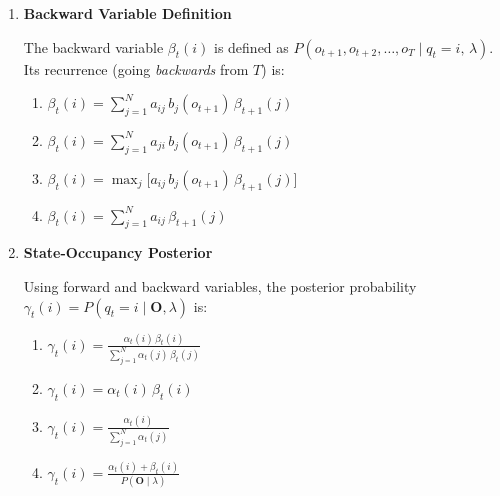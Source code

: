 \documentclass[12pt]{article}
\begin{document}
\begin{enumerate}[label=\textbf{Q\arabic*.}, leftmargin=*, itemsep=2em]
Given the forward variables $\{\alpha_t(i)\}$, the total likelihood
$P(\mathbf{O}\mid\lambda)$ is computed as:

\begin{enumerate}[label=\Alph*.]
    \item $\displaystyle P(\mathbf{O}\mid\lambda)
          = \sum_{i=1}^{N} \alpha_T(i)\,\beta_T(i)$
    \item $\displaystyle P(\mathbf{O}\mid\lambda)
          = \sum_{i=1}^{N} \alpha_T(i)$
    \item $\displaystyle P(\mathbf{O}\mid\lambda)
          = \max_{i} \alpha_T(i)$
    \item $\displaystyle P(\mathbf{O}\mid\lambda)
          = \prod_{t=1}^{T}\sum_{i=1}^{N} \alpha_t(i)$
\end{enumerate}

\item \textbf{Backward Variable Definition}

The backward variable $\beta_t(i)$ is defined as
$P(o_{t+1}, o_{t+2}, \dots, o_T \mid q_t = i,\, \lambda)$.
Its recurrence (going \emph{backwards} from $T$) is:

\begin{enumerate}[label=\Alph*.]
    \item $\displaystyle \beta_t(i)
          = \sum_{j=1}^{N} a_{ij}\, b_j(o_{t+1})\,\beta_{t+1}(j)$
    \item $\displaystyle \beta_t(i)
          = \sum_{j=1}^{N} a_{ji}\, b_j(o_{t+1})\,\beta_{t+1}(j)$
    \item $\displaystyle \beta_t(i)
          = \max_{j}\bigl[a_{ij}\, b_j(o_{t+1})\,\beta_{t+1}(j)\bigr]$
    \item $\displaystyle \beta_t(i)
          = \sum_{j=1}^{N} a_{ij}\,\beta_{t+1}(j)$
\end{enumerate}

\item \textbf{State-Occupancy Posterior}

Using forward and backward variables, the posterior probability
$\gamma_t(i) = P(q_t=i\mid\mathbf{O},\lambda)$ is:

\begin{enumerate}[label=\Alph*.]
    \item $\displaystyle \gamma_t(i)
          = \frac{\alpha_t(i)\,\beta_t(i)}{\displaystyle\sum_{j=1}^{N}\alpha_t(j)\,\beta_t(j)}$
    \item $\displaystyle \gamma_t(i)
          = \alpha_t(i)\,\beta_t(i)$
    \item $\displaystyle \gamma_t(i)
          = \frac{\alpha_t(i)}{\displaystyle\sum_{j=1}^{N}\alpha_t(j)}$
    \item $\displaystyle \gamma_t(i)
          = \frac{\alpha_t(i) + \beta_t(i)}{P(\mathbf{O}\mid\lambda)}$
\end{enumerate}


\end{enumerate}
\end{document}

